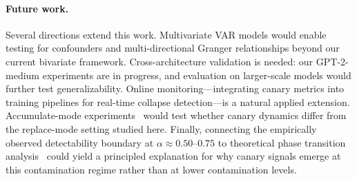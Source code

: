\paragraph{Future work.}
Several directions extend this work.
Multivariate VAR models would enable testing for confounders and multi-directional Granger relationships beyond our current bivariate framework.
Cross-architecture validation is needed: our GPT-2-medium experiments are in progress, and evaluation on larger-scale models would further test generalizability.
Online monitoring---integrating canary metrics into training pipelines for real-time collapse detection---is a natural applied extension.
Accumulate-mode experiments~\cite{dey2024breaking} would test whether canary dynamics differ from the replace-mode setting studied here.
Finally, connecting the empirically observed detectability boundary at $\alpha{\approx}0.50$--$0.75$ to theoretical phase transition analysis~\cite{truong2025entropy} could yield a principled explanation for why canary signals emerge at this contamination regime rather than at lower contamination levels.